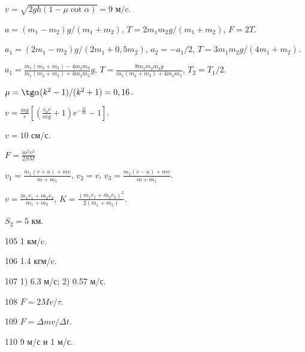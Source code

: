 \begin{Answer}{87}
$ v = \sqrt{2gh(1 - \mu \cot \alpha)} = 9 \textrm{ м/c}.$
\end{Answer}
\begin{Answer}{88}
$a = (m_1 - m_2)g / (m_1 + m_2)$, $T = 2 m_1 m_2 g /(m_1 + m_2)$, $F = 2T$.
\end{Answer}
\begin{Answer}{89}
$a_1 = (2m_1-m_2)g/(2m_1+0,5m_2)$, $a_2 = -a_1/2$, $T=3m_1 m_2g/(4m_1 + m_2)$.
\end{Answer}
\begin{Answer}{91}
$a_1 = \frac{m_1(m_2+m_3)-4m_2m_3}{m_1(m_2+m_3)+4m_2m_3}g$, $T= \frac{8m_1m_2m_3g}{m_1(m_2+m_3)+4m_2m_3}$, $T_2 = T_1/2$.
\end{Answer}
\begin{Answer}{92}
$\mu = \tg \alpha (k^2-1)/(k^2+1) = 0,16$.
\end{Answer}
\begin{Answer}{93}
$v = \frac{mg}{r}\left[ \left( \frac{v_0r}{mg} +1 \right)e^{-\frac{rt}{m}} - 1 \right]$.
\end{Answer}
\begin{Answer}{94}
$v=10$ см/с.
\end{Answer}
\begin{Answer}{95}
$F = \frac{m^2 v^2}{2SM}$
\end{Answer}
\begin{Answer}{96}
$v_1 = \frac{m_1(v+u)+mv}{m+m_1}$, $v_2 = v$, $v_3 = \frac{m_1(v-u)+mv}{m+m_1}$.
\end{Answer}
\begin{Answer}{97}
$v = \frac{m_1v_1 + m_2v_2}{m_1+m_2}$, $K = \frac{(m_1v_1+m_2v_2)^2}{2(m_1+m_2)}$.
\end{Answer}
\begin{Answer}{98}
$S_2 = 5$ км.
\end{Answer}
\begin{Answer}{105}
1 км/c.
\end{Answer}
\begin{Answer}{106}
1.4 кгм/c.
\end{Answer}
\begin{Answer}{107}
1) 6.3 м/с; 2) 0.57 м/с.
\end{Answer}
\begin{Answer}{108}
$F = 2Mv/\tau$.
\end{Answer}
\begin{Answer}{109}
$F = \Delta m v/ \Delta t$.
\end{Answer}
\begin{Answer}{110}
9 м/с и 1 м/с.
\end{Answer}
